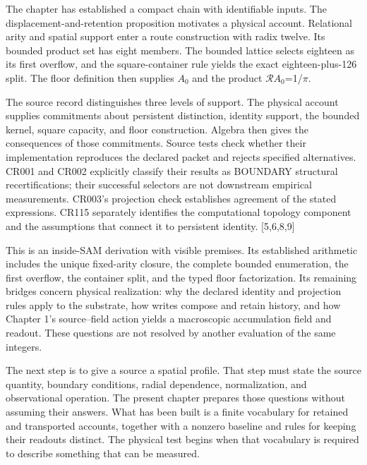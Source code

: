\documentclass[10pt,twocolumn,letterpaper]{article}
\begin{document}
The chapter has established a compact chain with identifiable inputs. The displacement-and-retention proposition motivates a physical account. Relational arity and spatial support enter a route construction with radix twelve. Its bounded product set has eight members. The bounded lattice selects eighteen as its first overflow, and the square-container rule yields the exact eighteen-plus-126 split. The floor definition then supplies \(A_0\) and the product \(\mathcal R\)\(A_0\)=1/\(\pi\).

The source record distinguishes three levels of support. The physical account supplies commitments about persistent distinction, identity support, the bounded kernel, square capacity, and floor construction. Algebra then gives the consequences of those commitments. Source tests check whether their implementation reproduces the declared packet and rejects specified alternatives. CR001 and CR002 explicitly classify their results as BOUNDARY structural recertifications; their successful selectors are not downstream empirical measurements. CR003's projection check establishes agreement of the stated expressions. CR115 separately identifies the computational topology component and the assumptions that connect it to persistent identity. {[}5,6,8,9{]}

This is an inside-SAM derivation with visible premises. Its established arithmetic includes the unique fixed-arity closure, the complete bounded enumeration, the first overflow, the container split, and the typed floor factorization. Its remaining bridges concern physical realization: why the declared identity and projection rules apply to the substrate, how writes compose and retain history, and how Chapter 1's source--field action yields a macroscopic accumulation field and readout. These questions are not resolved by another evaluation of the same integers.

The next step is to give a source a spatial profile. That step must state the source quantity, boundary conditions, radial dependence, normalization, and observational operation. The present chapter prepares those questions without assuming their answers. What has been built is a finite vocabulary for retained and transported accounts, together with a nonzero baseline and rules for keeping their readouts distinct. The physical test begins when that vocabulary is required to describe something that can be measured.
\end{document}
